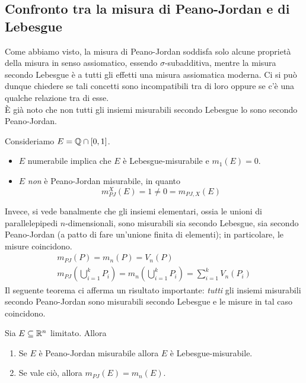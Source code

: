 \subsection{Confronto tra la misura di Peano-Jordan e di Lebesgue}
Come abbiamo visto, la misura di Peano-Jordan soddisfa solo alcune proprietà della misura in senso assiomatico, essendo $\sigma$-subadditiva, mentre la misura secondo Lebesgue è a tutti gli effetti una misura assiomatica moderna. Ci si può dunque chiedere se tali concetti sono incompatibili tra di loro oppure se c'è una qualche relazione tra di esse.\\
È già noto che non tutti gli insiemi misurabili secondo Lebesgue lo sono secondo Peano-Jordan.
\begin{example}
	Consideriamo $E=\mathbb{Q}\cap\left[0,1\right]$.
	\begin{itemize}
		\item $E$ numerabile implica che $E$ è Lebesgue-misurabile e $m_1(E)=0$.
		\item $E$ \textit{non} è Peano-Jordan misurabile, in quanto
		\begin{equation*}
			m_{PJ}^{X}(E)=1\neq 0=m_{PJ,X}(E)
		\end{equation*}
	\end{itemize}
\end{example}
Invece, si vede banalmente che gli insiemi elementari, ossia le unioni di parallelepipedi $n$-dimensionali, sono misurabili sia secondo Lebesgue, sia secondo Peano-Jordan (a patto di fare un'unione finita di elementi); in particolare, le misure coincidono.
\begin{gather*}
	m_{PJ}(P)=m_n(P)=V_n(P)\\
	m_{PJ}\left(\bigcup_{i=1}^{k}P_i\right)=m_n\left(\bigcup_{i=1}^{k}P_i\right)=\sum_{i=1}^{k}V_n\left(P_i\right)
\end{gather*}
Il seguente teorema ci afferma un risultato importante: \textit{tutti} gli insiemi misurabili secondo Peano-Jordan sono misurabili secondo Lebesgue e le misure in tal caso coincidono.
\begin{theorema}
	Sia $E\subseteq\mathbb{R}^n$ limitato. Allora
	\begin{enumerate}
		\item Se $E$ è Peano-Jordan misurabile allora $E$ è Lebesgue-misurabile.
		\item Se vale ciò, allora $m_{PJ}(E)=m_n(E)$.
	\end{enumerate}
\end{theorema}
